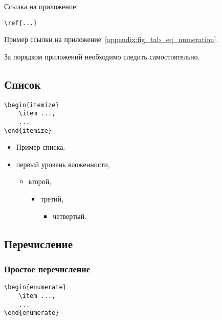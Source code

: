 \documentclass[14pt, a4paper, titlepage]{extarticle}
\begin{document}
Ссылка на приложение:
\begin{verbatim}
\ref{...}
\end{verbatim}

Пример ссылки на приложение~\ref{appendix:fig_tab_eq_numeration}.

За порядком приложений необходимо следить самостоятельно.

\subsection{Список}

\begin{verbatim}
\begin{itemize}
    \item ...,
    ...
\end{itemize}
\end{verbatim}

\begin{itemize}
    \item[] Пример списка:
    \item первый уровень вложенности,
    \begin{itemize}
        \item второй,
        \begin{itemize}
            \item третий,
            \begin{itemize}
                \item четвертый.
            \end{itemize}
        \end{itemize}
    \end{itemize}
\end{itemize}

\subsection{Перечисление}

\subsubsection{Простое перечисление}

\begin{verbatim}
\begin{enumerate}
    \item ...,
    ...
\end{enumerate} 
\end{verbatim}
\end{document}
